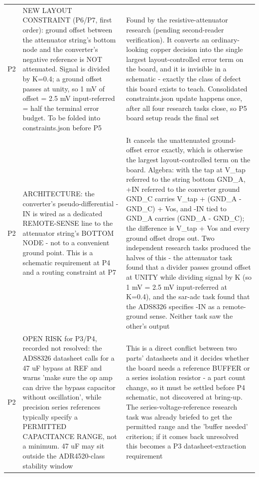 \documentclass[11pt,a4paper]{article}
\begin{document}
{\begin{longtable}{lp{5.2cm}p{7.2cm}}
P2 & NEW LAYOUT CONSTRAINT (P6/P7, first order): ground offset between the attenuator string's bottom node and the converter's negative reference is NOT attenuated. Signal is divided by K=0.4; a ground offset passes at unity, so 1 mV of offset = 2.5 mV input-referred = half the terminal error budget. To be folded into constraints.json before P5 & Found by the resistive-attenuator research (pending second-reader verification). It converts an ordinary-looking copper decision into the single largest layout-controlled error term on the board, and it is invisible in a schematic - exactly the class of defect this board exists to teach. Consolidated constraints.json update happens once, after all four research tasks close, so P5 board setup reads the final set \\
P2 & ARCHITECTURE: the converter's pseudo-differential -IN is wired as a dedicated REMOTE-SENSE line to the attenuator string's BOTTOM NODE - not to a convenient ground point. This is a schematic requirement at P4 and a routing constraint at P7 & It cancels the unattenuated ground-offset error exactly, which is otherwise the largest layout-controlled term on the board. Algebra: with the tap at V\_tap referred to the string bottom GND\_A, +IN referred to the converter ground GND\_C carries V\_tap + (GND\_A - GND\_C) + Vos, and -IN tied to GND\_A carries (GND\_A - GND\_C); the difference is V\_tap + Vos and every ground offset drops out. Two independent research tasks produced the halves of this - the attenuator task found that a divider passes ground offset at UNITY while dividing signal by K (so 1 mV = 2.5 mV input-referred at K=0.4), and the sar-adc task found that the ADS8326 specifies -IN as a remote-ground sense. Neither task saw the other's output \\
P2 & OPEN RISK for P3/P4, recorded not resolved: the ADS8326 datasheet calls for a 47 uF bypass at REF and warns 'make sure the op amp can drive the bypass capacitor without oscillation', while precision series references typically specify a PERMITTED CAPACITANCE RANGE, not a minimum. 47 uF may sit outside the ADR4520-class stability window & This is a direct conflict between two parts' datasheets and it decides whether the board needs a reference BUFFER or a series isolation resistor - a part count change, so it must be settled before P4 schematic, not discovered at bring-up. The series-voltage-reference research task was already briefed to get the permitted range and the 'buffer needed' criterion; if it comes back unresolved this becomes a P3 datasheet-extraction requirement \\

\end{longtable}}
\end{document}
